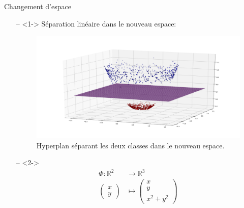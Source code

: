 \documentclass[9pt]{beamer}
\begin{document}
	\begin{frame}{Changement d'espace}
		\begin{itemize}
			\item[--]<1-> Séparation linéaire dans le nouveau espace:
			\begin{figure}[H]
				\includegraphics[width=.5\textwidth]{separation_x_2_y_2}
				\caption{\label{fig::mano_take_3} Hyperplan séparant les deux classes dans le nouveau espace.}

			\end{figure}
			\item[--]<2-> \begin{align*}
				\Phi: \mathbb{R}^2 &\rightarrow \mathbb{R}^3 \\
				\begin{pmatrix}
					x \\
					y
				\end{pmatrix} &\mapsto \begin{pmatrix}
					x \\
					y \\
					x^2 + y^2
				\end{pmatrix}
			\end{align*}
		\end{itemize}
	\end{frame}
\end{document}
